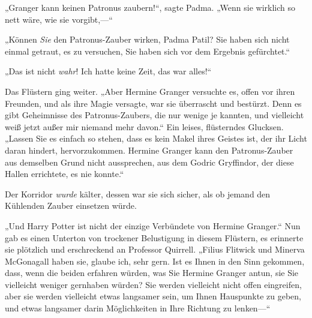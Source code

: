 „Granger kann keinen Patronus zaubern!“, sagte Padma. „Wenn sie wirklich so nett wäre, wie sie vorgibt,—“

„Können \emph{Sie} den Patronus-Zauber wirken, Padma Patil? Sie haben sich nicht einmal getraut, es zu versuchen, Sie haben sich vor dem Ergebnis gefürchtet.“

„Das ist nicht \emph{wahr}! Ich hatte keine Zeit, das war alles!“

Das Flüstern ging weiter. „Aber Hermine Granger versuchte es, offen vor ihren Freunden, und als ihre Magie versagte, war sie überrascht und bestürzt. Denn es gibt Geheimnisse des Patronus-Zaubers, die nur wenige je kannten, und vielleicht weiß jetzt außer mir niemand mehr davon.“ Ein leises, flüsterndes Glucksen. „Lassen Sie es einfach so stehen, dass es kein Makel ihres Geistes ist, der ihr Licht daran hindert, hervorzukommen. Hermine Granger kann den Patronus-Zauber aus demselben Grund nicht aussprechen, aus dem Godric Gryffindor, der diese Hallen errichtete, es nie konnte.“

Der Korridor \emph{wurde} kälter, dessen war sie sich sicher, als ob jemand den Kühlenden Zauber einsetzen würde.

„Und Harry Potter ist nicht der einzige Verbündete von Hermine Granger.“ Nun gab es einen Unterton von trockener Belustigung in diesem Flüstern, es erinnerte sie plötzlich und erschreckend an Professor Quirrell. „Filius Flitwick und Minerva McGonagall haben sie, glaube ich, sehr gern. Ist es Ihnen in den Sinn gekommen, dass, wenn die beiden erfahren würden, was Sie Hermine Granger antun, sie Sie vielleicht weniger gernhaben würden? Sie werden vielleicht nicht offen eingreifen, aber sie werden vielleicht etwas langsamer sein, um Ihnen Hauspunkte zu geben, und etwas langsamer darin Möglichkeiten in Ihre Richtung zu lenken—“

